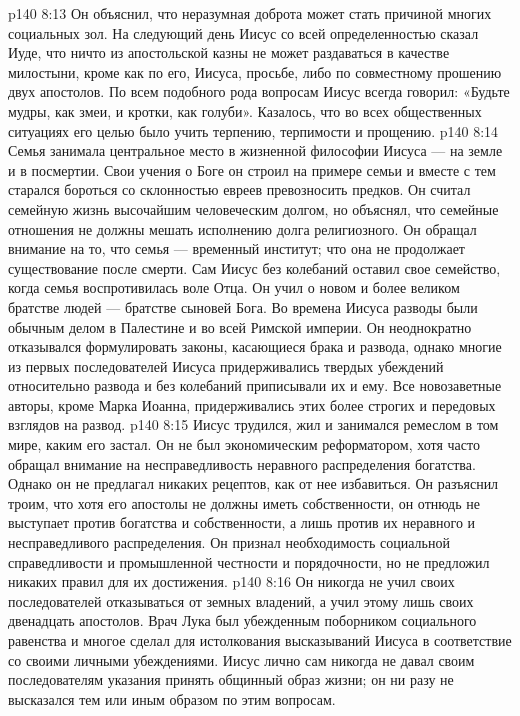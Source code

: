 \vs p140 8:13 Он объяснил, что неразумная доброта может стать причиной многих социальных зол. На следующий день Иисус со всей определенностью сказал Иуде, что ничто из апостольской казны не может раздаваться в качестве милостыни, кроме как по его, Иисуса, просьбе, либо по совместному прошению двух апостолов. По всем подобного рода вопросам Иисус всегда говорил: «Будьте мудры, как змеи, и кротки, как голуби». Казалось, что во всех общественных ситуациях его целью было учить терпению, терпимости и прощению.
\vs p140 8:14 Семья занимала центральное место в жизненной философии Иисуса --- на земле и в посмертии. Свои учения о Боге он строил на примере семьи и вместе с тем старался бороться со склонностью евреев превозносить предков. Он считал семейную жизнь высочайшим человеческим долгом, но объяснял, что семейные отношения не должны мешать исполнению долга религиозного. Он обращал внимание на то, что семья --- временный институт; что она не продолжает существование после смерти. Сам Иисус без колебаний оставил свое семейство, когда семья воспротивилась воле Отца. Он учил о новом и более великом братстве людей --- братстве сыновей Бога. Во времена Иисуса разводы были обычным делом в Палестине и во всей Римской империи. Он неоднократно отказывался формулировать законы, касающиеся брака и развода, однако многие из первых последователей Иисуса придерживались твердых убеждений относительно развода и без колебаний приписывали их и ему. Все новозаветные авторы, кроме Марка Иоанна, придерживались этих более строгих и передовых взглядов на развод.
\vs p140 8:15 \bibnobreakspace {} Иисус трудился, жил и занимался ремеслом в том мире, каким его застал. Он не был экономическим реформатором, хотя часто обращал внимание на несправедливость неравного распределения богатства. Однако он не предлагал никаких рецептов, как от нее избавиться. Он разъяснил троим, что хотя его апостолы не должны иметь собственности, он отнюдь не выступает против богатства и собственности, а лишь против их неравного и несправедливого распределения. Он признал необходимость социальной справедливости и промышленной честности и порядочности, но не предложил никаких правил для их достижения.
\vs p140 8:16 Он никогда не учил своих последователей отказываться от земных владений, а учил этому лишь своих двенадцать апостолов. Врач Лука был убежденным поборником социального равенства и многое сделал для истолкования высказываний Иисуса в соответствие со своими личными убеждениями. Иисус лично сам никогда не давал своим последователям указания принять общинный образ жизни; он ни разу не высказался тем или иным образом по этим вопросам.
